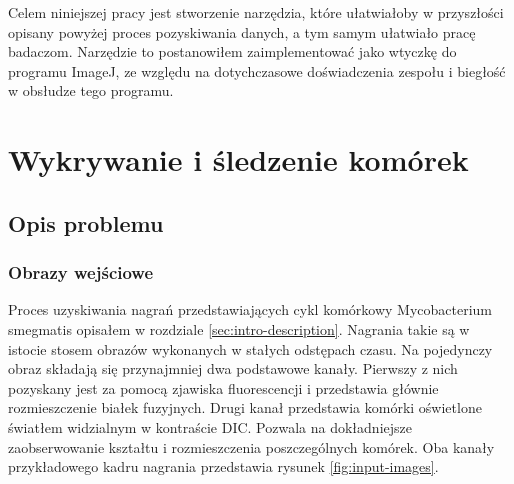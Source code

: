\documentclass[declaration,shortabstract,mgr]{iithesis}
\begin{document}
Celem niniejszej pracy jest stworzenie narzędzia, które ułatwiałoby w przyszłości opisany powyżej proces pozyskiwania danych, a tym samym ułatwiało pracę badaczom.
Narzędzie to postanowiłem zaimplementować jako wtyczkę do programu ImageJ, ze względu na dotychczasowe doświadczenia zespołu i biegłość w obsłudze tego programu.



\chapter{Wykrywanie i śledzenie komórek}
\label{cha:detection-and-tracking}



\section{Opis problemu}
\label{sec:problem}

\subsection{Obrazy wejściowe}
\label{sec:input-images}

Proces uzyskiwania nagrań przedstawiających cykl komórkowy Mycobacterium smegmatis opisałem w rozdziale \ref{sec:intro-description}.
Nagrania takie są w istocie stosem obrazów wykonanych w stałych odstępach czasu.
Na pojedynczy obraz składają się przynajmniej dwa podstawowe kanały.
Pierwszy z nich pozyskany jest za pomocą zjawiska fluorescencji i przedstawia głównie rozmieszczenie białek fuzyjnych.
Drugi kanał przedstawia komórki oświetlone światłem widzialnym w kontraście DIC.
Pozwala na dokładniejsze zaobserwowanie kształtu i rozmieszczenia poszczególnych komórek.
Oba kanały przykładowego kadru nagrania przedstawia rysunek \ref{fig:input-images}.
\end{document}
